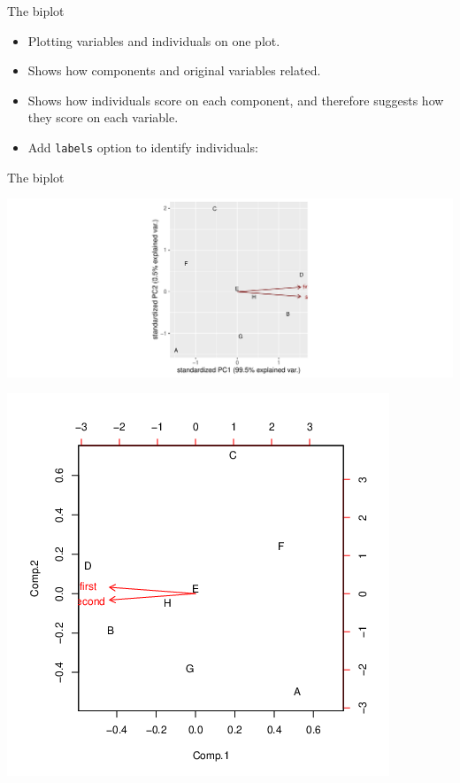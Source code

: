\documentclass[
  ignorenonframetext,
]{beamer}
\newenvironment{Shaded}{\begin{snugshade}}{\end{snugshade}}
\newcommand{\DataTypeTok}[1]{\textcolor[rgb]{0.13,0.29,0.53}{#1}}
\newcommand{\KeywordTok}[1]{\textcolor[rgb]{0.13,0.29,0.53}{\textbf{#1}}}
\newcommand{\NormalTok}[1]{#1}
\newcommand{\OperatorTok}[1]{\textcolor[rgb]{0.81,0.36,0.00}{\textbf{#1}}}
\newcommand{\StringTok}[1]{\textcolor[rgb]{0.31,0.60,0.02}{#1}}
\begin{document}
\begin{frame}[fragile]{The biplot}
\protect\hypertarget{the-biplot}{}

\begin{itemize}
\item
  Plotting variables and individuals on one plot.
\item
  Shows how components and original variables related.
\item
  Shows how individuals score on each component, and therefore suggests
  how they score on each variable.
\item
  Add \texttt{labels} option to identify individuals:
\end{itemize}

\begin{Shaded}
\end{Shaded}

\end{frame}

\begin{frame}{The biplot}
\protect\hypertarget{the-biplot-1}{}

\includegraphics{slides_d29_files/figure-beamer/ff3-1.pdf}

\includegraphics{bPrincomp-test-biplot.png}

\end{frame}
\end{document}
